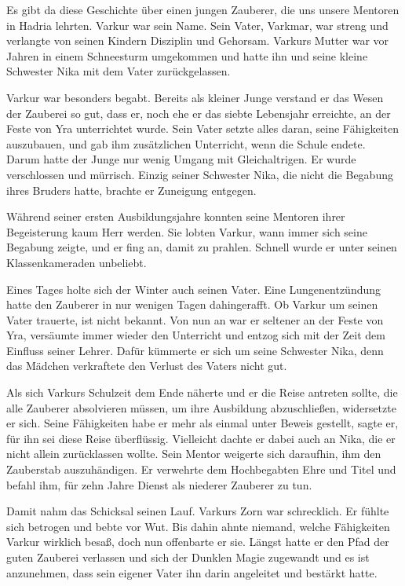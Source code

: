 \documentclass[10pt, a4paper, oneside]{book}
\begin{document}
\begin{multicols}{2}
Es gibt da diese Geschichte über einen jungen Zauberer, die uns unsere Mentoren in Hadria lehrten. Varkur war sein Name. Sein Vater, Varkmar, war streng und verlangte von seinen Kindern Disziplin und Gehorsam. Varkurs Mutter war vor Jahren in einem Schneesturm umgekommen und hatte ihn und seine kleine Schwester Nika mit dem Vater zurückgelassen.

Varkur war besonders begabt. Bereits als kleiner Junge verstand er das Wesen der Zauberei so gut, dass er, noch ehe er das siebte Lebensjahr erreichte, an der Feste von Yra unterrichtet wurde. Sein Vater setzte alles daran, seine Fähigkeiten auszubauen, und gab ihm zusätzlichen Unterricht, wenn die Schule endete. Darum hatte der Junge nur wenig Umgang mit Gleichaltrigen. Er wurde verschlossen und mürrisch. Einzig seiner Schwester Nika, die nicht die Begabung ihres Bruders hatte, brachte er Zuneigung entgegen.

Während seiner ersten Ausbildungsjahre konnten seine Mentoren ihrer Begeisterung kaum Herr werden. Sie lobten Varkur, wann immer sich seine Begabung zeigte, und er fing an, damit zu prahlen. Schnell wurde er unter seinen Klassenkameraden unbeliebt.

Eines Tages holte sich der Winter auch seinen Vater. Eine Lungenentzündung hatte den Zauberer in nur wenigen Tagen dahingerafft. Ob Varkur um seinen Vater trauerte, ist nicht bekannt. Von nun an war er seltener an der Feste von Yra, versäumte immer wieder den Unterricht und entzog sich mit der Zeit dem Einfluss seiner Lehrer. Dafür kümmerte er sich um seine Schwester Nika, denn das Mädchen verkraftete den Verlust des Vaters nicht gut.

Als sich Varkurs Schulzeit dem Ende näherte und er die Reise antreten sollte, die alle Zauberer absolvieren müssen, um ihre Ausbildung abzuschließen, widersetzte er sich. Seine Fähigkeiten habe er mehr als einmal unter Beweis gestellt, sagte er, für ihn sei diese Reise überflüssig. Vielleicht dachte er dabei auch an Nika, die er nicht allein zurücklassen wollte. Sein Mentor weigerte sich daraufhin, ihm den Zauberstab auszuhändigen. Er verwehrte dem Hochbegabten Ehre und Titel und befahl ihm, für zehn Jahre Dienst als niederer Zauberer zu tun.

Damit nahm das Schicksal seinen Lauf. Varkurs Zorn war schrecklich. Er fühlte sich betrogen und bebte vor Wut. Bis dahin ahnte niemand, welche Fähigkeiten Varkur wirklich besaß, doch nun offenbarte er sie. Längst hatte er den Pfad der guten Zauberei verlassen und sich der Dunklen Magie zugewandt und es ist anzunehmen, dass sein eigener Vater ihn darin angeleitet und bestärkt hatte.


\end{multicols}
\end{document}

